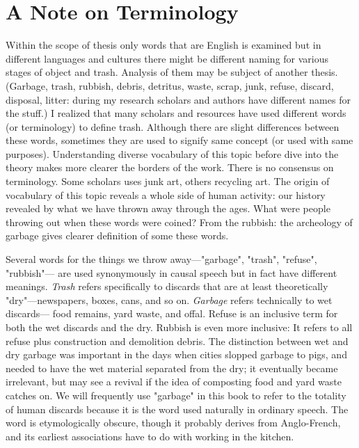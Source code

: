 
\section{A Note on Terminology}
Within the scope of thesis only words that are English is examined but in different languages and cultures there might be different naming for various stages of object and trash. Analysis of them may be subject of another thesis. (Garbage, trash, rubbish, debris, detritus, waste, scrap, junk, refuse, discard, disposal, litter: during my research scholars and authors have different names for the stuff.) I realized that many scholars and resources have used different words (or terminology) to define trash. Although there are slight differences between these words, sometimes they are used to signify same concept (or used with same purposes). Understanding diverse vocabulary of this topic before dive into the theory makes more clearer the borders of the work. There is no consensus on terminology. Some scholars uses junk art, others recycling art. The origin of vocabulary of this topic reveals a whole side of human activity: our history revealed by what we have thrown away through the ages. What were people throwing out when these words were coined? From the rubbish: the archeology of garbage gives clearer definition of some these words.

Several words for the things we throw away---"garbage", "trash", "refuse", "rubbish"--- are used synonymously in causal speech but in fact have different meanings. \textit{Trash} refers specifically to discards that are at least theoretically "dry"---newspapers, boxes, cans, and so on. \textit{Garbage} refers technically to wet discards--- food remains, yard waste, and offal. Refuse is an inclusive term for both the wet discards and the dry. Rubbish is even more inclusive: It refers to all refuse plus construction and demolition debris. The distinction between wet and dry garbage was important in the days when cities slopped garbage to pigs, and needed to have the wet material separated from the dry; it eventually became irrelevant, but may see a revival if the idea of composting food and yard waste catches on. We will frequently use "garbage" in this book to refer to the totality of human discards because it is the word used naturally in ordinary speech. The word is etymologically obscure, though it probably derives from Anglo-French, and its earliest associations have to do with working in the kitchen.

